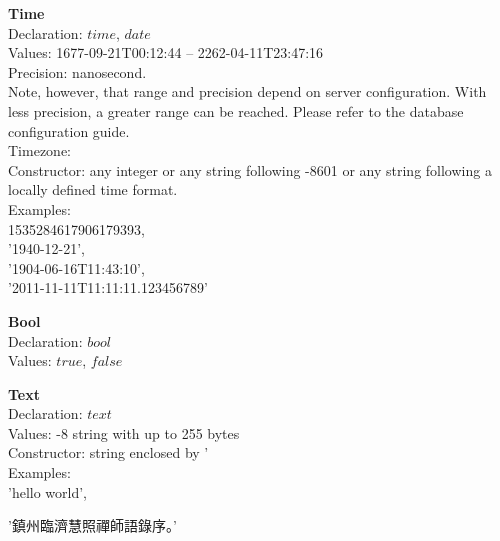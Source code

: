 \begin{minipage}{\textwidth}
\textbf{Time} \\
Declaration: $time$, $date$ \\
Values:   1677-09-21T00:12:44 --
          2262-04-11T23:47:16 \\
Precision: nanosecond. \\
Note, however, that range and precision depend on server configuration.
With less precision, a greater range can be reached.
Please refer to the database configuration guide. \\
Timezone:  \\
Constructor: any integer or any string following -8601 
or any string following a locally defined time format. \\
Examples:\\
1535284617906179393, \\
'1940-12-21', \\
'1904-06-16T11:43:10', \\
'2011-11-11T11:11:11.123456789'
\end{minipage}

\begin{minipage}{\textwidth}
\textbf{Bool} \\
Declaration: $bool$ \\
Values: $true$, $false$
\end{minipage}

\begin{minipage}{\textwidth}
\textbf{Text} \\
Declaration: $text$ \\
Values: -8 string with up to 255 bytes\\
Constructor: string enclosed by ' \\
Examples:\\
'hello world',\\
\begin{CJK}{UTF8}{gbsn}
'鎮州臨濟慧照禪師語錄序。' 
\end{CJK} \\
\end{minipage}

